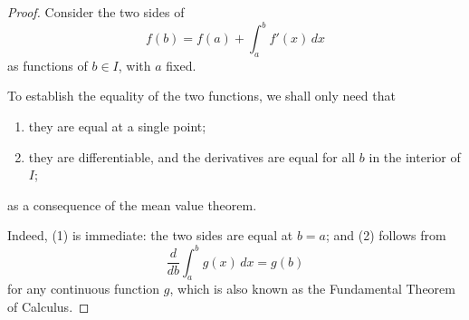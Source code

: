 

\begin{proof}

Consider the two sides of 
$$
f(b) = f(a) + \int_a^b f'(x)\,dx 
$$
as functions of $b\in I$, with $a$ fixed.

To establish the equality of the two functions, we shall only 
need that
\begin{enumerate}
\item they are equal at a single point;
\item they are differentiable, and the derivatives are equal 
for all $b$ in the interior of $I$;
\end{enumerate}
as a consequence of the mean value theorem.

Indeed, (1) is immediate: the two sides are equal at $b=a$; 
and (2) follows from 
$$
\frac{d}{db}\int_a^b g(x)\,dx = g(b)
$$
for any continuous function $g$, which is also known as 
the Fundamental Theorem of Calculus.

\end{proof}

